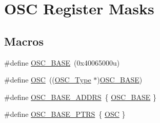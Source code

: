 \hypertarget{group___o_s_c___register___masks}{}\section{O\+SC Register Masks}
\label{group___o_s_c___register___masks}
\subsection*{Macros}
\begin{DoxyCompactItemize}
\item 
\#define \mbox{\hyperlink{group___o_s_c___register___masks_ga7455a62769c499f9083f5e84ca19429f}{O\+S\+C\+\_\+\+B\+A\+SE}}~(0x40065000u)
\item 
\#define \mbox{\hyperlink{group___o_s_c___register___masks_gac9fd21467d416baa7f6aa4c175f8c6b5}{O\+SC}}~((\mbox{\hyperlink{struct_o_s_c___type}{O\+S\+C\+\_\+\+Type}} $\ast$)\mbox{\hyperlink{group___o_s_c___register___masks_ga7455a62769c499f9083f5e84ca19429f}{O\+S\+C\+\_\+\+B\+A\+SE}})
\item 
\#define \mbox{\hyperlink{group___o_s_c___register___masks_ga31b4aa65d54d63cd13bdf2915e86f31a}{O\+S\+C\+\_\+\+B\+A\+S\+E\+\_\+\+A\+D\+D\+RS}}~\{ \mbox{\hyperlink{group___o_s_c___register___masks_ga7455a62769c499f9083f5e84ca19429f}{O\+S\+C\+\_\+\+B\+A\+SE}} \}
\item 
\#define \mbox{\hyperlink{group___o_s_c___register___masks_ga46f69fcb9d660e18b5cbf51adbbcec78}{O\+S\+C\+\_\+\+B\+A\+S\+E\+\_\+\+P\+T\+RS}}~\{ \mbox{\hyperlink{group___o_s_c___register___masks_gac9fd21467d416baa7f6aa4c175f8c6b5}{O\+SC}} \}
\end{DoxyCompactItemize}
